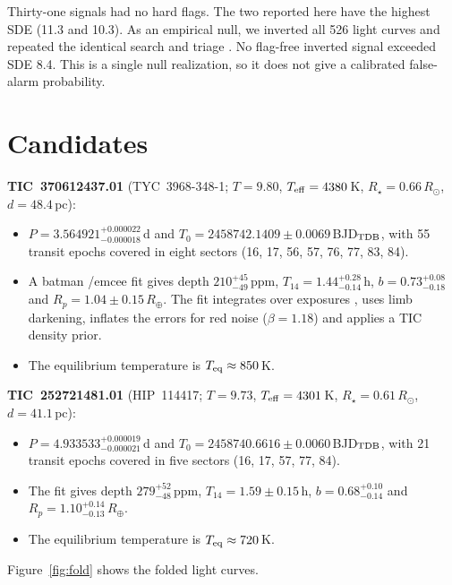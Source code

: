\documentclass{aastex701}
\begin{document}
Thirty-one signals had no hard flags. The two reported here have the highest SDE (11.3 and 10.3). As an empirical null, we inverted all 526 light curves and repeated the identical search and triage \citep[cf.][]{Thompson2018}. No flag-free inverted signal exceeded SDE 8.4. This is a single null realization, so it does not give a calibrated false-alarm probability.

\section{Candidates}
\textbf{TIC~370612437.01} (TYC~3968-348-1; $T=9.80$, $T_{\rm eff}=4380$\,K, $R_\star=0.66\,R_\odot$, $d=48.4$\,pc):
\begin{itemize}
\item $P=3.564921^{+0.000022}_{-0.000018}$\,d and $T_0=2458742.1409\pm0.0069$\,BJD$_{\rm TDB}$, with 55 transit epochs covered in eight sectors (16, 17, 56, 57, 76, 77, 83, 84).
\item A batman \citep{Kreidberg2015}/emcee \citep{ForemanMackey2013} fit gives depth $210^{+45}_{-49}$\,ppm, $T_{14}=1.44^{+0.28}_{-0.14}$\,h, $b=0.73^{+0.08}_{-0.18}$ and $R_p=1.04\pm0.15\,R_\oplus$. The fit integrates over exposures \citep{Kipping2010}, uses \citet{Claret2017} limb darkening, inflates the errors for red noise ($\beta=1.18$) and applies a TIC density prior.
\item The equilibrium temperature is $T_{\rm eq}\approx850$\,K.
\end{itemize}

\textbf{TIC~252721481.01} (HIP~114417; $T=9.73$, $T_{\rm eff}=4301$\,K, $R_\star=0.61\,R_\odot$, $d=41.1$\,pc):
\begin{itemize}
\item $P=4.933533^{+0.000019}_{-0.000021}$\,d and $T_0=2458740.6616\pm0.0060$\,BJD$_{\rm TDB}$, with 21 transit epochs covered in five sectors (16, 17, 57, 77, 84).
\item The fit gives depth $279^{+52}_{-48}$\,ppm, $T_{14}=1.59\pm0.15$\,h, $b=0.68^{+0.10}_{-0.14}$ and $R_p=1.10^{+0.14}_{-0.13}\,R_\oplus$.
\item The equilibrium temperature is $T_{\rm eq}\approx720$\,K.
\end{itemize}

Figure~\ref{fig:fold} shows the folded light curves.
\end{document}
